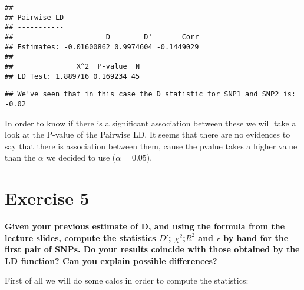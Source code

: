 \documentclass[]{article}
\begin{document}
\begin{verbatim}
## 
## Pairwise LD
## -----------
##                      D        D'       Corr
## Estimates: -0.01600862 0.9974604 -0.1449029
## 
##               X^2  P-value  N
## LD Test: 1.889716 0.169234 45
\end{verbatim}

\begin{verbatim}
## We've seen that in this case the D statistic for SNP1 and SNP2 is: -0.02
\end{verbatim}

In order to know if there is a significant association between these we
will take a look at the P-value of the Pairwise LD. It seems that there
are no evidences to say that there is association between them, cause
the pvalue takes a higher value than the \(\alpha\) we decided to use
(\(\alpha=0.05\)).

\section{Exercise 5}\label{exercise-5}

\textbf{Given your previous estimate of D, and using the formula from
the lecture slides, compute the statistics \(D'\); \(\chi^2\);\(R^2\)
and \(r\) by hand for the first pair of SNPs. Do your results coincide
with those obtained by the LD function? Can you explain possible
differences?}

First of all we will do some calcs in order to compute the statistics:
\end{document}
